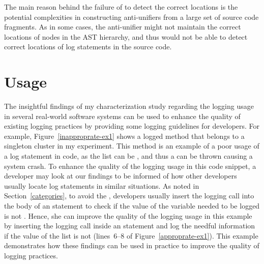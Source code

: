 The main reason behind the failure of  to detect the correct locations is the potential complexities in constructing anti-unifiers from a large set of source code fragments. As in some cases, the anti-unifier might not maintain the correct locations of nodes in the AST hierarchy, and thus  would not be able to detect correct locations of log statements in the source code.





\section{Usage}  \label{usageELUS}
The insightful findings of my characterization study regarding the logging usage in several real-world software systems can be used to enhance the quality of existing logging practices by providing some logging guidelines for developers. For example, Figure~\ref{inapproprate-ex1} shows a logged method that belongs to a singleton cluster in my experiment. This  method is an example of a poor usage of a log statement in code, as the list  can be , and thus a  can be thrown causing a system crash. To enhance the quality of the logging usage in this code snippet, a developer may look at our findings to be informed of how other developers usually locate log statements in similar situations. As noted in Section~\ref{categories}, to avoid the , developers usually insert the logging call into the body of an  statement to check if the value of the variable needed to be logged is not . Hence, she can improve the quality of the logging usage in this example by inserting the logging call inside an  statement and log the needful information if the value of the list  is not  (lines~6--8 of Figure~\ref{approprate-ex1}). This example demonstrates how these findings can be used in practice to improve the quality of logging practices.


